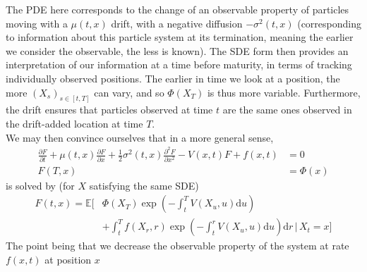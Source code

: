 \documentclass{tikzposter} %
\newcommand\Ej{\mathbb{E}}
\newcommand\pdiff[2]{\ensuremath{\frac{\partial #1}{\partial #2}}}
\newcommand\pkdiff[3]{\ensuremath{\frac{\partial^{#1} #2}{\partial #3^{#1}}}}
\newtheorem{definition}{Definition}
\begin{document}
\begin{columns}
{{    The PDE here corresponds to the change of an observable property of particles moving with a $\mu(t, x)$ drift, with a negative diffusion $-\sigma^2(t, x)$ (corresponding to information about this particle system at its termination, meaning the earlier we consider the observable, the less is known). The SDE form then provides an interpretation of our information at a time before maturity, in terms of tracking individually observed positions. The earlier in time we look at a position, the more $(X_s)_{s \in [t, T]}$ can vary, and so $\Phi(X_T)$ is thus more variable. Furthermore, the drift ensures that particles observed at time $t$ are the same ones observed in the drift-added location at time $T$. \\

    We may then convince ourselves that in a more general sense,
    \begin{align*}
      \pdiff{F}{t} + \mu(t, x) \pdiff{F}{x} + \frac12 \sigma^2(t, x) \pkdiff{2}{F}{x} - V(x, t)F + f(x, t) &= 0 \\
      F(T, x) &= \Phi(x)
    \end{align*}
    is solved by (for $X$ satisfying the same SDE)
    \begin{align*}
      F(t, x) = \Ej\Bigg[&\Phi(X_T) \exp\left(-\int_t^T V(X_u, u) \mathrm{d}u\right) \\
      & + \int_t^T f(X_r, r) \exp\left(-\int_t^r V(X_u, u) \mathrm{d}u\right) \mathrm{d}r \,\Bigg|\, X_t = x\Bigg]
    \end{align*}
    The point being that we decrease the observable property of the system at rate $f(x, t)$ at position $x$ 
    }
    \hphantom{}

    }
\end{columns}
\end{document}
